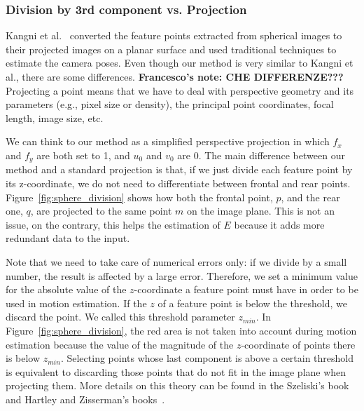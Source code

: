 \subsubsection{Division by 3rd component vs. Projection}
%
Kangni et al.~\cite{kangni2007orientation} converted the 
feature points extracted from spherical images to their projected images on a 
planar surface and used traditional techniques to estimate the camera poses.
%
Even though our method is very similar to Kangni et al., there are some differences.
\textbf{Francesco's note: CHE DIFFERENZE???}
Projecting a point means that we have to deal with perspective geometry and its
parameters (e.g., pixel size or density), the principal point coordinates, 
focal length, image size, etc.

We can think to our method as a simplified perspective projection in which
$f_x$ and $f_y$ are both set to 1, and $u_0$ and $v_0$ are 0.
The main difference between our method and a standard projection is that, if we
just divide each feature point by its z-coordinate, we do not need to 
differentiate between frontal and rear points.
Figure~\ref{fig:sphere_division} shows how both the frontal point, $p$, and the 
rear one, $q$, are projected to the same point $m$ on the image plane.
This is not an issue, on the contrary, this helps the estimation of $E$ because 
it adds more redundant data to the input.

Note that we need to take care of numerical errors only: if we divide by a 
small number, the result is affected by a large error. Therefore, we
set a minimum value for the absolute value of the $z$-coordinate a feature point must 
have in order to be used in motion estimation. If the $z$ of a
feature point is below the threshold, we discard the point.
%
We called this threshold parameter $z_{min}$.
In Figure~\ref{fig:sphere_division}, the red area is not taken into account 
during motion estimation because the value of the magnitude of the 
$z$-coordinate of points there 
is below $z_{min}$.
%
Selecting points whose last component is above a certain threshold is 
equivalent to discarding those points that do not fit in the image plane
when projecting them. More details on this theory can be found in the
Szeliski's book~\cite{szeliski2010computer} and Hartley and Zisserman's
books~\cite{Hartley2004}.

